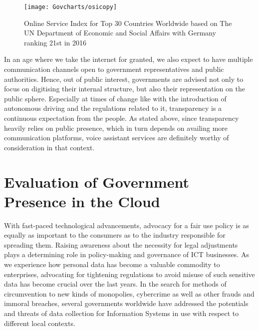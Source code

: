 \begin{figure}[h]
	\centering
	\caption[United Nations Online Service Index (Top 30)]{Online Service Index for Top 30 Countries Worldwide based on The UN Department of Economic and Social Affairs \cite{un:egovReport} with Germany ranking 21st in 2016}
	\label{un:osi}
	\texttt{[image: Govcharts/osicopy]} 
\end{figure}

In an age where we take the internet for granted,
we also expect to have multiple communication channels open to government representatives and public authorities. 
%
Hence, out of public interest, governments are advised not only to focus on digitising their internal structure, but also their representation on the public sphere.
Especially at times of change like with the introduction of autonomous driving and the regulations related to it, transparency is a continuous expectation from the people. As stated above, since transparency heavily relies on public presence, which in turn depends on availing more communication platforms, voice assistant services are definitely worthy of consideration in that context.


\section{Evaluation of Government Presence in the Cloud}
With fast-paced technological advancements, advocacy for a fair use policy is as equally as important to the consumers as to the industry responsible for spreading them. Raising awareness about the necessity for legal adjustments %
plays a determining role in policy-making and governance of ICT businesses. As we experience how personal data has become a valuable commodity to enterprises, advocating for tightening regulations to avoid misuse of such sensitive data has become crucial over the last years. In the search for methods of circumvention to new kinds of monopolies, cybercrime as well as other frauds and immoral breaches, several governments worldwide have addressed the potentials and threats of data collection for Information Systems in use with respect to different local contexts. 





